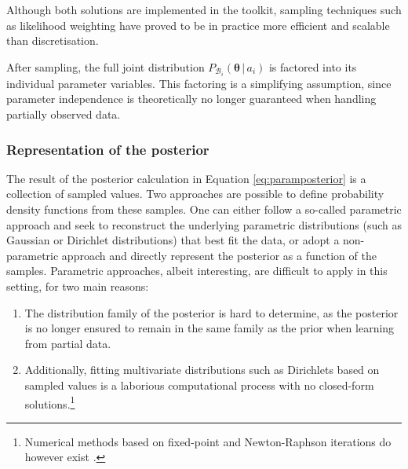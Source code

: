 Although both solutions are implemented in the \opendial toolkit, sampling techniques such as likelihood weighting have proved to be in practice more efficient and scalable than discretisation. 

After sampling, the full joint distribution $P_{\mathcal{B}_i}(\boldsymbol\theta \, | \, a_i)$ is factored into its individual parameter variables. This factoring is a simplifying assumption, since parameter independence is theoretically no longer guaranteed when handling partially observed data. 

\subsubsection*{Representation of the posterior}

The result of the posterior calculation in Equation \eqref{eq:paramposterior} is a collection of sampled values. Two approaches are possible to define probability density functions from these samples. One can either follow a so-called parametric approach and seek to reconstruct the underlying parametric distributions (such as Gaussian or Dirichlet distributions) that best fit the data, or adopt a non-parametric approach and directly represent the posterior as a function of the samples. Parametric approaches, albeit interesting, are difficult to apply in this setting, for two main reasons:
\begin{enumerate}
\item The distribution family of the posterior is hard to determine, as the posterior is no longer ensured to remain in the same family as the prior when learning from partial data.  
\item Additionally, fitting multivariate distributions such as Dirichlets based on sampled values is a laborious computational process with no closed-form solutions.\footnote{Numerical methods based on fixed-point and Newton-Raphson iterations do however exist \citep{minka2003}.}
\end{enumerate}


